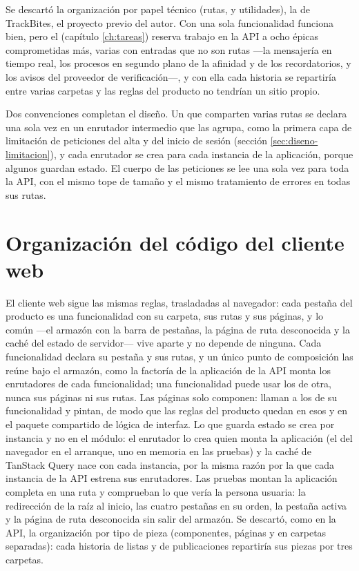 Se descartó la organización por papel técnico (rutas,  y utilidades), la de TrackBites, el proyecto previo del autor.
Con una sola funcionalidad funciona bien, pero el  (capítulo \ref{ch:tareas}) reserva trabajo en la \ac{API} a ocho épicas comprometidas más, varias con entradas que no son rutas —la mensajería en tiempo real, los procesos en segundo plano de la afinidad y de los recordatorios, y los avisos del proveedor de verificación—, y con ella cada historia se repartiría entre varias carpetas y las reglas del producto no tendrían un sitio propio.

Dos convenciones completan el diseño.
Un  que comparten varias rutas se declara una sola vez en un enrutador intermedio que las agrupa, como la primera capa de limitación de peticiones del alta y del inicio de sesión (sección \ref{sec:diseno-limitacion}), y cada enrutador se crea para cada instancia de la aplicación, porque algunos guardan estado.
El cuerpo de las peticiones se lee una sola vez para toda la \ac{API}, con el mismo tope de tamaño y el mismo tratamiento de errores en todas sus rutas.

\section{Organización del código del cliente web}
\label{sec:diseno-organizacion-web}

El cliente web sigue las mismas reglas, trasladadas al navegador: cada pestaña del producto es una funcionalidad con su carpeta, sus rutas y sus páginas, y lo común —el armazón con la barra de pestañas, la página de ruta desconocida y la caché del estado de servidor— vive aparte y no depende de ninguna.
Cada funcionalidad declara su pestaña y sus rutas, y un único punto de composición las reúne bajo el armazón, como la factoría de la aplicación de la \ac{API} monta los enrutadores de cada funcionalidad; una funcionalidad puede usar los  de otra, nunca sus páginas ni sus rutas.
Las páginas solo componen: llaman a los  de su funcionalidad y pintan, de modo que las reglas del producto quedan en esos  y en el paquete compartido de lógica de interfaz.
Lo que guarda estado se crea por instancia y no en el módulo: el enrutador lo crea quien monta la aplicación (el del navegador en el arranque, uno en memoria en las pruebas) y la caché de TanStack Query nace con cada instancia, por la misma razón por la que cada instancia de la \ac{API} estrena sus enrutadores.
Las pruebas montan la aplicación completa en una ruta y comprueban lo que vería la persona usuaria: la redirección de la raíz al inicio, las cuatro pestañas en su orden, la pestaña activa y la página de ruta desconocida sin salir del armazón.
Se descartó, como en la \ac{API}, la organización por tipo de pieza (componentes, páginas y  en carpetas separadas): cada historia de listas y de publicaciones repartiría sus piezas por tres carpetas.

